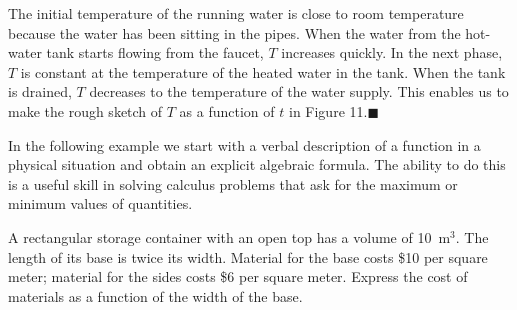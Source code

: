 \documentclass{sebase}
\begin{document}
\begin{Solution}
The initial temperature of
the running water is close to room temperature because the water has been
sitting in the pipes. When the water from the hot-water tank starts flowing
from the faucet, $T$ increases quickly. In the next phase, $T$ is constant
at the temperature of the heated water in the tank. When the tank is
drained, $T$ decreases to the temperature of the water supply. This enables
us to make the rough sketch of $T$ as a function of $t$ in Figure 11.\vspace{%
-12pt}$\blacksquare $
\end{Solution}

In the following example we start with a verbal description of a function in
a physical situation and obtain an explicit algebraic formula. The ability
to do this is a useful skill in solving calculus problems that ask for the
maximum or minimum values of quantities.\vspace{-6pt}

\begin{Example}[5]
\VIDEO%
%
%
A rectangular storage container with an open top has a volume of 10~m$^{3}$.
The length of its base is twice its width. Material for the base costs \$10
per square meter; material for the sides costs \$6 per square meter. Express
the cost of materials as a function of the width of the base.
\end{Example}
\end{document}

